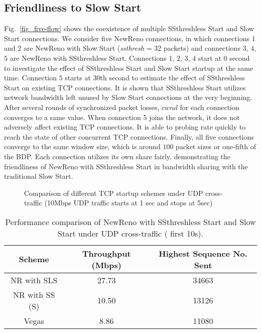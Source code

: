 \documentclass[12pt,onecolumn]{IEEEtran}
\begin{document}
\subsection{Friendliness to Slow Start}

Fig.~\ref{fig_five-flow} shows the coexistence of multiple SSthreshless Start
and Slow Start connections. We consider five NewReno connections, in which
connections $1$ and $2$ are NewReno with Slow Start (\emph{ssthresh} = 32
packets) and connections $3$, $4$, $5$ are NewReno with SSthreshless Start.
Connections $1$, $2$, $3$, $4$ start at $0$ second to investigate the effect of
SSthreshless Start and Slow Start startup at the same time. Connection $5$
starts at $30$th second to estimate the effect of SSthreshless Start on
existing TCP connections. It is shown that SSthreshless Start utilizes network
bandwidth left unused by Slow Start connections at the very beginning. After
several rounds of synchronized packet losses, $cwnd$ for each connection
converges to a same value. When connection $5$ joins the network, it does not
adversely affect existing TCP connections. It is able to probing rate quickly to
reach the state of other concurrent TCP connections. Finally, all five
connections converge to the same window size, which is around $100$ packet
sizes or one-fifth of the BDP. Each connection utilizes its own share fairly,
demonstrating the friendliness of NewReno with SSthreshless Start in bandwidth
sharing with the traditional Slow Start.

\begin{figure}
 \centering
  \centering
  \caption{Comparison of different TCP startup schemes under UDP cross-traffic (10Mbps UDP traffic starts at 1 sec and stops at 5sec)}
\label{fig_UDP}
\end{figure}
\begin{table}[h]
\centering
\label{table5}\caption{\footnotesize Performance comparison of NewReno with SSthreshless Start and Slow Start under UDP cross-traffic ( first 10s).}
\begin{tabular}{|c|c|c|} \hline
Scheme & Throughput (Mbps) & Highest Sequence No. Sent\\ \hline \hline
NR with SLS & 27.73   &  34663 \\ \hline NR with SS (S)  & 10.50  & 13126  \\ \hline
Vegas  & 8.86  & 11080  \\ \hline \end{tabular}
\end{table}
\end{document}
